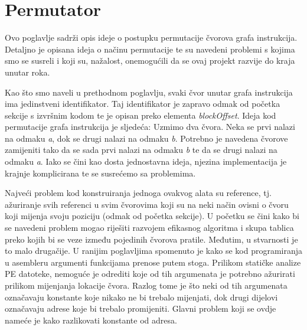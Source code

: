 \documentclass[times, utf8, diplomski, numeric]{fer}
\begin{document}
\section{Permutator}
\label{sct:permutator}
Ovo poglavlje sadrži opis ideje o postupku permutacije čvorova grafa instrukcija. Detaljno je opisana ideja o načinu permutacije te su navedeni problemi s kojima smo se susreli i koji su, nažalost, onemogućili da se ovaj projekt razvije do kraja unutar roka.

Kao što smo naveli u prethodnom poglavlju, svaki čvor unutar grafa instrukcija ima jedinstveni identifikator. Taj identifikator je zapravo odmak od početka sekcije s izvršnim kodom te je opisan preko elementa \emph{blockOffset}. Ideja kod permutacije grafa instrukcija je sljedeća: Uzmimo dva čvora. Neka se prvi nalazi na odmaku \emph{a}, dok se drugi nalazi na odmaku \emph{b}. Potrebno je navedena čvorove zamijeniti tako da se sada prvi nalazi na odmaku \emph{b} te da se drugi nalazi na odmaku \emph{a}. Iako se čini kao dosta jednostavna ideja, njezina implementacija je krajnje komplicirana te se susrećemo sa problemima.

Najveći problem kod konstruiranja jednoga ovakvog alata su reference, tj. ažuriranje svih referenci u svim čvorovima koji su na neki način ovisni o čvoru koji mijenja svoju poziciju (odmak od početka sekcije). U početku se čini kako bi se navedeni problem mogao riješiti razvojem efikasnog algoritma i skupa tablica preko kojih bi se veze između pojedinih čvorova pratile. Međutim, u stvarnosti je to malo drugačije. U ranijim poglavljima spomenuto je kako se kod programiranja u asembleru argumenti funkcijama prenose putem stoga. Prilikom statičke analize PE datoteke, nemoguće je odrediti koje od tih argumenata je potrebno ažurirati prilikom mijenjanja lokacije čvora. Razlog tome je što neki od tih argumenata označavaju konstante koje nikako ne bi trebalo mijenjati, dok drugi dijelovi označavaju adrese koje bi trebalo promijeniti. Glavni problem koji se ovdje nameće je kako razlikovati konstante od adresa. 
\end{document}
